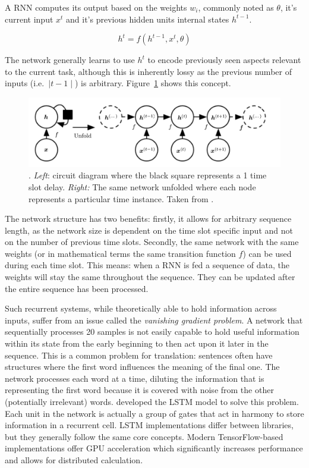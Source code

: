 A \ac{RNN} computes its output based on the weights $w_i$, commonly noted as $\theta$, it's current input
$x^t$ and it's previous hidden units internal states $h^{t-1}$.

\begin{equation}
    h^t = f(h^{t-1}, x^t, \theta)
\end{equation}

\noindent The network generally learns to use $h^t$ to encode previously seen aspects relevant to the current task, although this
is inherently lossy as the previous number of inputs (i.e.\ $\mid t-1\mid$) is arbitrary. Figure~\ref{fig:rnn_concept}
shows this concept.

\begin{figure}[]
    \centering
    \includegraphics[width=0.8\linewidth]{img/rnn_concept.png}
    \caption[Recurrent Neural Network conceptualized]{. \emph{Left}: circuit diagram where the black square represents a
        1 time slot delay. \emph{Right:} The same network unfolded where each node represents a particular time instance.
    Taken from \citet{Goodfellow-et-al-2016}.}
    \label{fig:rnn_concept}
\end{figure}

The network structure has two benefits: firstly, it allows for arbitrary sequence length, as the network size is
dependent on the time slot specific input and not on the number of previous time slots. Secondly, the same network with
the same weights (or in mathematical terms the same transition function $f$) can be used during each time slot. This
means: when a \ac{RNN} is fed a sequence of data, the weights will stay the same throughout the sequence. They can be
updated after the entire sequence has been processed.

Such recurrent systems, while theoretically able to hold information across inputs, suffer from an issue called the
\emph{vanishing gradient problem}. A network that sequentially processes 20 samples is not easily capable to hold useful
information within its state from the early beginning to then act upon it later in the sequence. This is a common
problem for translation: sentences often have structures where the first word influences the meaning of the final one.
The network processes each word at a time, diluting the information that is representing the first word because it
is covered with noise from the other (potentially irrelevant) words. \citet{Hochreiter:1997:LSM:1246443.1246450}
developed the \ac{LSTM} model to solve this problem. Each unit in the network is actually a group of gates that act in
harmony to store information in a recurrent cell. \ac{LSTM} implementations differ between libraries, but they generally
follow the same core concepts. Modern TensorFlow-based implementations offer \ac{GPU} acceleration which significantly
increases performance and allows for distributed calculation.


